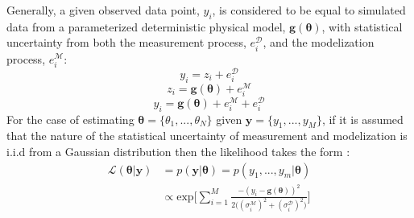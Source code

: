 Generally, a given observed data point, $y_i$, is considered to be equal to simulated data from a parameterized deterministic physical model, $\bm{g}(\bm{\theta})$, with statistical uncertainty from both the measurement process, $e^{\mathcal{D}}_i$, and the modelization process, $e^{\mathcal{M}}_i$:
\begin{equation}
y_i = z_i + e^{\mathcal{D}}_i
\end{equation}
\begin{equation}
z_i = \bm{g}(\bm{\theta}) + e^{\mathcal{M}}_i
\end{equation}
\begin{equation}
y_i = \bm{g}(\bm{\theta}) + e^{\mathcal{M}}_i + e^{\mathcal{D}}_i
\end{equation}
For the case of estimating $\bm{\theta} = \{\theta_1,...,\theta_N\}$ given $\bm{y} = \{y_1,...,y_M\}$, if it is assumed that the nature of the statistical uncertainty of measurement and modelization is i.i.d from a Gaussian distribution then the likelihood takes the form \citet[p.91-92]{gregory2005bayesian}: 
\begin{equation}
\begin{split}
\mathcal{L}(\bm{\theta}|\bm{y}) &= p(\bm{y}|\bm{\theta}) = p(y_1,...,y_m|\bm{\theta})\\
&\propto  \text{exp}\bigg[\sum_{i = 1}^{M}\frac{-(y_i-\bm{g}({\bm{\theta}}))^2}{2\big((\sigma^{\mathcal{M}}_i)^2+(\sigma^{\mathcal{D}}_i)^2\big)}\bigg]
\end{split}
\label{likelihood-1}
\end{equation}



